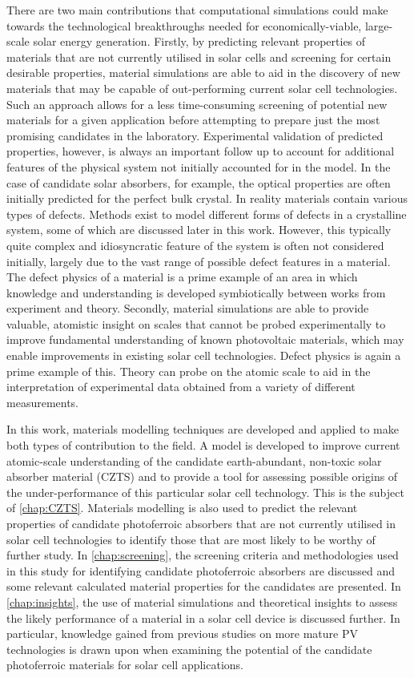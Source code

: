 \documentclass[11pt, twoside]{report}
\begin{document}
There are two main contributions that computational simulations could make towards the technological breakthroughs needed for economically-viable, large-scale solar energy generation. Firstly, by predicting relevant properties of materials that are not currently utilised in solar cells and screening for certain desirable properties, material simulations are able to aid in the discovery of new materials that may be capable of out-performing current solar cell technologies. Such an approach allows for a less time-consuming screening of potential new materials for a given application before attempting to prepare just the most promising candidates in the laboratory. Experimental validation of predicted properties, however, is always an important follow up to account for additional features of the physical system not initially accounted for in the model. In the case of candidate solar absorbers, for example, the optical properties are often initially predicted for the perfect bulk crystal. In reality materials contain various types of defects. Methods exist to model different forms of defects in a crystalline system, some of which are discussed later in this work. However, this typically quite complex and idiosyncratic feature of the system is often not considered initially, largely due to the vast range of possible defect features in a material. The defect physics of a material is a prime example of an area in which knowledge and understanding is developed symbiotically between works from experiment and theory. Secondly, material simulations are able to provide valuable, atomistic insight on scales that cannot be probed experimentally to improve fundamental understanding of known photovoltaic materials, which may enable improvements in existing solar cell technologies. Defect physics is again a prime example of this. Theory can probe on the atomic scale to aid in the interpretation of experimental data obtained from a variety of different measurements.

In this work, materials modelling techniques are developed and applied to make both types of contribution to the field. A model is developed to improve current atomic-scale understanding of the candidate earth-abundant, non-toxic solar absorber material {\CZTS} (CZTS) and to provide a tool for assessing possible origins of the under-performance of this particular solar cell technology. This is the subject of \autoref{chap:CZTS}. Materials modelling is also used to predict the relevant properties of candidate photoferroic absorbers that are not currently utilised in solar cell technologies to identify those that are most likely to be worthy of further study. In \autoref{chap:screening}, the screening criteria and methodologies used in this study for identifying candidate photoferroic absorbers are discussed and some relevant calculated material properties for the candidates are presented. In \autoref{chap:insights}, the use of material simulations and theoretical insights to assess the likely performance of a material in a solar cell device is discussed further. In particular, knowledge gained from previous studies on more mature PV technologies is drawn upon when examining the potential of the candidate photoferroic materials for solar cell applications.
\end{document}
